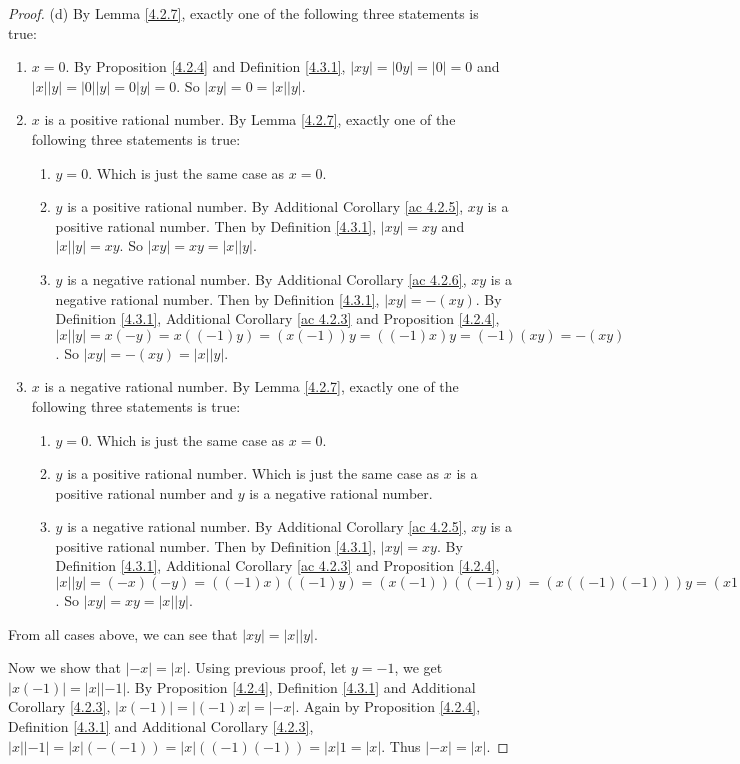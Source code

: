\begin{proof}{(d)}
By Lemma \ref{4.2.7}, exactly one of the following three statements is true:
\begin{enumerate}[label=(\Roman*)]
    \item \(x = 0\).
    By Proposition \ref{4.2.4} and Definition \ref{4.3.1}, \(|xy| = |0y| = |0| = 0\) and \(|x||y| = |0||y| = 0|y| = 0\).
    So \(|xy| = 0 = |x||y|\).
    \item \(x\) is a positive rational number.
    By Lemma \ref{4.2.7}, exactly one of the following three statements is true:
    \begin{enumerate}[label=(\roman*)]
        \item \(y = 0\).
        Which is just the same case as \(x = 0\).
        \item \(y\) is a positive rational number.
        By Additional Corollary \ref{ac 4.2.5}, \(xy\) is a positive rational number.
        Then by Definition \ref{4.3.1}, \(|xy| = xy\) and \(|x||y| = xy\).
        So \(|xy| = xy = |x||y|\).
        \item \(y\) is a negative rational number.
        By Additional Corollary \ref{ac 4.2.6}, \(xy\) is a negative rational number.
        Then by Definition \ref{4.3.1}, \(|xy| = -(xy)\).
        By Definition \ref{4.3.1}, Additional Corollary \ref{ac 4.2.3} and Proposition \ref{4.2.4}, \(|x||y| = x(-y) = x((-1)y) = (x(-1))y = ((-1)x)y = (-1)(xy) = -(xy)\).
        So \(|xy| = -(xy) = |x||y|\).
    \end{enumerate}
    \item \(x\) is a negative rational number.
    By Lemma \ref{4.2.7}, exactly one of the following three statements is true:
    \begin{enumerate}[label=(\roman*)]
        \item \(y = 0\).
        Which is just the same case as \(x = 0\).
        \item \(y\) is a positive rational number.
        Which is just the same case as \(x\) is a positive rational number and \(y\) is a negative rational number.
        \item \(y\) is a negative rational number.
        By Additional Corollary \ref{ac 4.2.5}, \(xy\) is a positive rational number.
        Then by Definition \ref{4.3.1}, \(|xy| = xy\).
        By Definition \ref{4.3.1}, Additional Corollary \ref{ac 4.2.3} and Proposition \ref{4.2.4}, \(|x||y| = (-x)(-y) = ((-1)x)((-1)y) = (x(-1))((-1)y) = (x((-1)(-1)))y = (x1)y = xy\).
        So \(|xy| = xy = |x||y|\).
    \end{enumerate}
\end{enumerate}
From all cases above, we can see that \(|xy| = |x||y|\).

Now we show that \(|-x| = |x|\).
Using previous proof, let \(y = -1\), we get \(|x(-1)| = |x||-1|\).
By Proposition \ref{4.2.4}, Definition \ref{4.3.1} and Additional Corollary \ref{4.2.3}, \(|x(-1)| = |(-1)x| = |-x|\).
Again by Proposition \ref{4.2.4}, Definition \ref{4.3.1} and Additional Corollary \ref{4.2.3}, \(|x||-1| = |x|(-(-1)) = |x|((-1)(-1)) = |x|1 = |x|\).
Thus \(|-x| = |x|\).
\end{proof}

